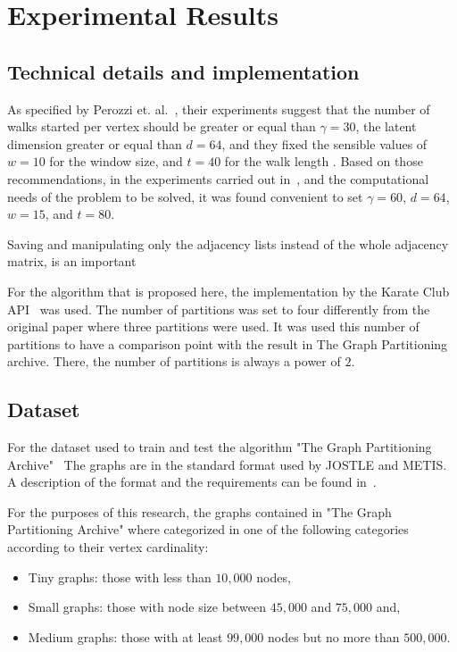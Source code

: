 %
%
\let\textcircled=\pgftextcircled
\chapter{Experimental Results}
\label{Chapter4}

\section{Technical details and implementation}
As specified by Perozzi et. al.~\cite{deepwalk}, their experiments suggest that the number of walks started per vertex should be greater or equal than $\gamma=30$, the latent dimension greater or equal than $d=64$, and they fixed the sensible values of $w=10$ for the window size, and $t=40$ for the walk length . Based on those recommendations, in the experiments carried out in~\cite{deepwalk_hyper}, and the computational needs of the problem to be solved, it was found convenient to set $\gamma=60$, $d=64$, $w=15$, and $t=80$.

Saving and manipulating only the adjacency lists instead of the whole adjacency matrix, is an important 

For the algorithm that is proposed here, the implementation by the Karate Club API~\cite{karateclub} was used.
The number of partitions was set to four differently from the original paper where three partitions were used. It was used this number of partitions to have a comparison point with the result in The Graph Partitioning archive. There, the number of partitions is always a power of $2$.

\section{Dataset}

    For the dataset used to train and test the algorithm "The Graph Partitioning Archive"~\cite{archive}
The graphs are in the standard format used by JOSTLE and METIS. A description of the format and the requirements can be found in~\cite{jostle}.

For the purposes of this research, the graphs contained in "The Graph Partitioning Archive" where categorized in one of the following categories according to their vertex cardinality: 
\begin{itemize}
    \item Tiny graphs: those with less than $10,000$ nodes,
    \item Small graphs: those with node size between $45,000$ and $75,000$ and,
    \item Medium graphs: those with at least $99,000$ nodes but no more than $500,000$.
\end{itemize}

